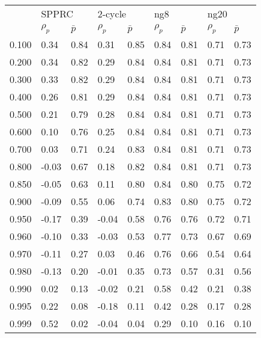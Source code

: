\begin{tabular}{lllllllll}
\toprule
{} & \multicolumn{2}{l}{SPPRC} & \multicolumn{2}{l}{2-cycle} & \multicolumn{2}{l}{ng8} & \multicolumn{2}{l}{ng20} \\
{} & $\rho_p$ & $\bar p$ & $\rho_p$ & $\bar p$ & $\rho_p$ & $\bar p$ & $\rho_p$ & $\bar p$ \\
\midrule
0.100 &     0.34 &     0.84 &     0.31 &     0.85 &     0.84 &     0.81 &     0.71 &     0.73 \\
0.200 &     0.34 &     0.82 &     0.29 &     0.84 &     0.84 &     0.81 &     0.71 &     0.73 \\
0.300 &     0.33 &     0.82 &     0.29 &     0.84 &     0.84 &     0.81 &     0.71 &     0.73 \\
0.400 &     0.26 &     0.81 &     0.29 &     0.84 &     0.84 &     0.81 &     0.71 &     0.73 \\
0.500 &     0.21 &     0.79 &     0.28 &     0.84 &     0.84 &     0.81 &     0.71 &     0.73 \\
0.600 &     0.10 &     0.76 &     0.25 &     0.84 &     0.84 &     0.81 &     0.71 &     0.73 \\
0.700 &     0.03 &     0.71 &     0.24 &     0.83 &     0.84 &     0.81 &     0.71 &     0.73 \\
0.800 &    -0.03 &     0.67 &     0.18 &     0.82 &     0.84 &     0.81 &     0.71 &     0.73 \\
0.850 &    -0.05 &     0.63 &     0.11 &     0.80 &     0.84 &     0.80 &     0.75 &     0.72 \\
0.900 &    -0.09 &     0.55 &     0.06 &     0.74 &     0.83 &     0.80 &     0.75 &     0.72 \\
0.950 &    -0.17 &     0.39 &    -0.04 &     0.58 &     0.76 &     0.76 &     0.72 &     0.71 \\
0.960 &    -0.10 &     0.33 &    -0.03 &     0.53 &     0.77 &     0.73 &     0.67 &     0.69 \\
0.970 &    -0.11 &     0.27 &     0.03 &     0.46 &     0.76 &     0.66 &     0.54 &     0.64 \\
0.980 &    -0.13 &     0.20 &    -0.01 &     0.35 &     0.73 &     0.57 &     0.31 &     0.56 \\
0.990 &     0.02 &     0.13 &    -0.02 &     0.21 &     0.58 &     0.42 &     0.21 &     0.38 \\
0.995 &     0.22 &     0.08 &    -0.18 &     0.11 &     0.42 &     0.28 &     0.17 &     0.28 \\
0.999 &     0.52 &     0.02 &    -0.04 &     0.04 &     0.29 &     0.10 &     0.16 &     0.10 \\
\bottomrule
\end{tabular}
